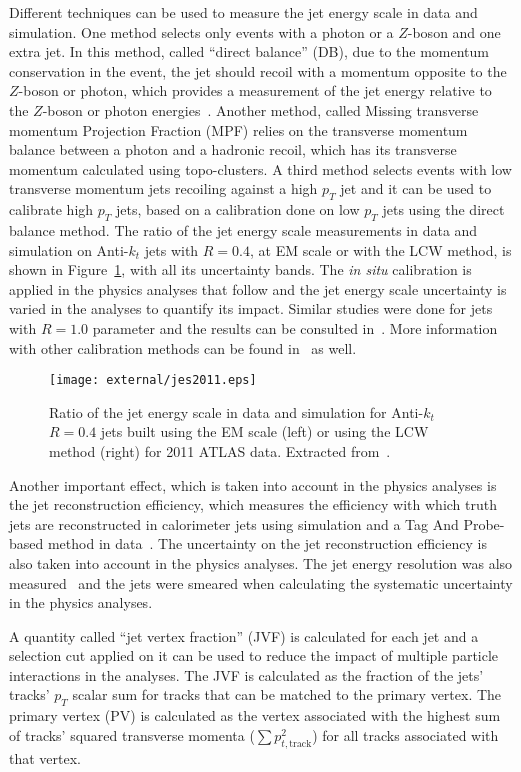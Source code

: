Different techniques can be used to measure the jet energy scale in data and simulation. One method selects only events with a photon or a $Z$-boson and one extra jet.
In this method, called ``direct balance'' (DB),
due to the momentum conservation in the event, the jet should recoil with a momentum opposite to the $Z$-boson or photon, which provides a measurement
of the jet energy relative to the $Z$-boson or photon energies~\cite{jes2011}. Another method, called Missing transverse momentum Projection Fraction (MPF)
relies on the transverse momentum balance between a photon and a hadronic recoil, which has its transverse momentum calculated using topo-clusters. A third
method selects events with low transverse momentum jets recoiling against a high $p_T$ jet and it can be used to calibrate high $p_T$ jets, based on a
calibration done on low $p_T$ jets using the direct balance method. The ratio of the jet energy scale measurements in data and simulation on Anti-$k_t$ jets
with $R=0.4$, at EM scale or with the LCW method, is shown in Figure~\ref{fig:jes2011}, with all its uncertainty bands. The \emph{in situ} calibration
is applied in the physics analyses that follow and the jet energy scale uncertainty is varied in the analyses to quantify its impact. Similar studies were done
for jets with $R=1.0$ parameter and the results can be consulted in~\cite{fatjet_confnote}. More information with other
calibration methods can be found in~\cite{ttjets_jer} as well.

\begin{figure}
\centering
\texttt{[image: external/jes2011.eps]}
\caption{Ratio of the jet energy scale in data and simulation for Anti-$k_t$ $R=0.4$ jets built using the EM scale (left) or using the LCW method (right) for 2011 ATLAS data. Extracted from~\cite{jes2011}.}
\label{fig:jes2011}
\end{figure}

Another important effect, which is taken into account in the physics analyses is the jet reconstruction efficiency, which measures the efficiency with which
truth jets are reconstructed in calorimeter jets using simulation and a Tag And Probe-based method in data~\cite{ttjets_jer}.
The uncertainty on the jet reconstruction efficiency is also taken into account in the physics analyses.
The jet energy resolution was also measured~\cite{jetreso2010,ttjets_jer} and the jets were smeared when calculating the systematic uncertainty in the physics
analyses.

A quantity called ``jet vertex fraction'' (JVF) is calculated for each jet and a selection cut applied on it
can be used to reduce the impact of multiple particle interactions
in the analyses. The JVF is calculated as the fraction of the jets' tracks' $p_T$ scalar sum for tracks that can be matched to the primary vertex.
The primary vertex (PV) is calculated as the vertex associated with the highest sum of tracks' squared transverse momenta ($\sum p_{t,\textrm{track}}^2$)
for all tracks associated with that vertex.

